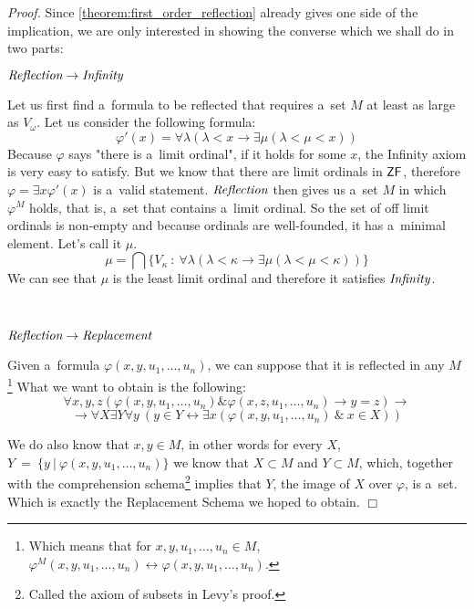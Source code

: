 \documentclass[12pt,a4paper]{article}
\newenvironment{proof}
{\noindent \textit{Proof.}}
{\hspace*{\fill} $\Box$}
\renewcommand{\iff}{\leftrightarrow}
\newcommand{\then}{\rightarrow}
\begin{document}
\begin{proof}
Since \ref{theorem:first_order_reflection} already gives one side of the implication, we are only interested in showing the converse which we shall do in two parts:

$\bold{\emph{Reflection} \then \emph{Infinity}}$

Let us first find a~formula to be reflected that requires a~set $M$ at least as large as $V_\omega$.
Let us consider the following formula:
\begin{equation}
\varphi'(x) = \forall \lambda(\lambda < x \then \exists \mu(\lambda < \mu < x))
\end{equation}
Because $\varphi$ says "there is a~limit ordinal", if it holds for some $x$, the Infinity axiom is very easy to satisfy. But we know that there are limit ordinals in $\sf{ZF}$, therefore $\varphi = \exists x \varphi'(x)$ is a~valid statement. $\emph{Reflection}$ then gives us a~set $M$ in which $\varphi^M$ holds, that is, a~set that contains a~limit ordinal. So the set of off limit ordinals is non-empty and because ordinals are well-founded, it has a~minimal element. Let's call it $\mu$.
\begin{equation}
\mu = \bigcap \{V_\kappa\ :\  \forall \lambda(\lambda < \kappa \then \exists \mu(\lambda < \mu < \kappa))\}
\end{equation}
We can see that $\mu$ is the least limit ordinal and therefore it satisfies $\emph{Infinity}$.

\

$\bold{\emph{Reflection} \then \emph{Replacement}}$

Given a~formula $\varphi(x, y, u_1, \ldots, u_n)$, we can suppose that it is reflected in any $M$ \footnote{Which means that for $x, y, u_1, \ldots, u_n \in M$, $\varphi^M(x, y, u_1, \ldots, u_n) \iff \varphi(x, y, u_1, \ldots, u_n)$.}
What we want to obtain is the following:
\begin{equation}
\forall x, y, z (\varphi(x, y, u_1, \ldots, u_n) \& \varphi(x, z, u_1, \ldots, u_n) \then y = z) \then
\end{equation}
\begin{equation}
\then \forall X \exists Y \forall y\ (y \in Y \iff \exists x (\varphi(x, y, u_1, \ldots, u_n)\ \&\ x \in X ))
\end{equation}

We do also know that $x, y \in M$, in other words for every $X$, $Y\ =\ \{y\ |\ \varphi(x, y, u_1, \ldots, u_n)\}$ we know that $X \subset M$ and $Y \subset M$, which, together with the comprehension schema\footnote{Called the axiom of subsets in Levy's proof.} implies that $Y$, the image of $X$ over $\varphi$, is a~set.
Which is exactly the Replacement Schema we hoped to obtain.
\end{proof}
\end{document}
